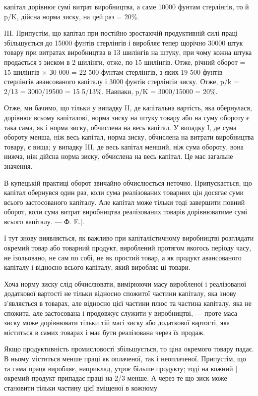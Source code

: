 капітал дорівнює сумі витрат виробництва, а саме 10000 фунтам стерлінгів, то й p/K, дійсна норма
зиску, на цей раз = 20\%.

III. Припустім, що капітал при постійно зростаючій продуктивній силі праці збільшується до 15000
фунтів стерлінгів і виробляє тепер щорічно 30000 штук товару при витратах виробництва в 13 шилінгів
на штуку, при чому кожна штука продається з зиском в 2 шилінги, отже, по 15 шилінгів. Отже, річний
оборот = 15 шилінгів × З0 000 = 22 500 фунтам стерлінгів, з яких 19 500 фунтів стерлінгів
авансованого капіталу і 3000 фунтів стерлінгів зиску. Отже, p/k = 2/13 = 3000/19500 = 15  5/13\%.
Навпаки, p/K = 3000/15000 = 20\%.

Отже, ми бачимо, що тільки у випадку II, де капітальна вартість, яка обернулася, дорівнює всьому
капіталові, норма зиску на штуку товару або на суму обороту є така сама, як і норма зиску, обчислена
на весь капітал. У випадку І, де сума обороту менша, ніж весь капітал, норма зиску, обчислена на
витрати виробництва товару, є вища; у випадку III, де весь капітал менший, ніж сума обороту, вона
нижча, ніж дійсна норма зиску, обчислена на весь капітал. Це має загальне значення.

В купецькій практиці оборот звичайно обчислюється неточно. Припускається, що капітал обернувся один
раз, коли сума реалізованих товарних цін досягає суми всього застосованого капіталу. Але капітал
може тільки тоді завершити повний оборот, коли сума витрат виробництва реалізованих товарів
дорівнюватиме сумі всього капіталу. — Ф. E.].

І тут знову виявляється, як важливо при капіталістичному виробництві розглядати окремий товар або
товарний продукт, вироблений протягом якогось періоду часу, не ізольовано, не сам по собі, не як
простий товар, а як продукт авансованого капіталу і відносно всього капіталу, який виробляє ці
товари.

Хоча норму зиску слід обчислювати, вимірюючи масу виробленої і реалізованої додаткової вартості не
тільки відносно спожитої частини капіталу, яка знову з’являється в товарах, але відносно цієї
частини плюс та частина капіталу, яка не спожита, але застосована і продовжує служити у виробництві,
— проте маса зиску може дорівнювати тільки тій масі зиску або додаткової вартості, яка міститься в
самих товарах і має бути реалізована через їх продаж.

Якщо продуктивність промисловості збільшується, то ціна окремого товару падає. В ньому міститься
менше праці як оплаченої, так і неоплаченої. Припустім, що та сама праця виробляє, наприклад, утроє
більше продукту; тоді на кожний | окремий продукт припадає праці на 2/3 менше. А через те що зиск
може становити тільки частину цієї вміщеної в кожному
